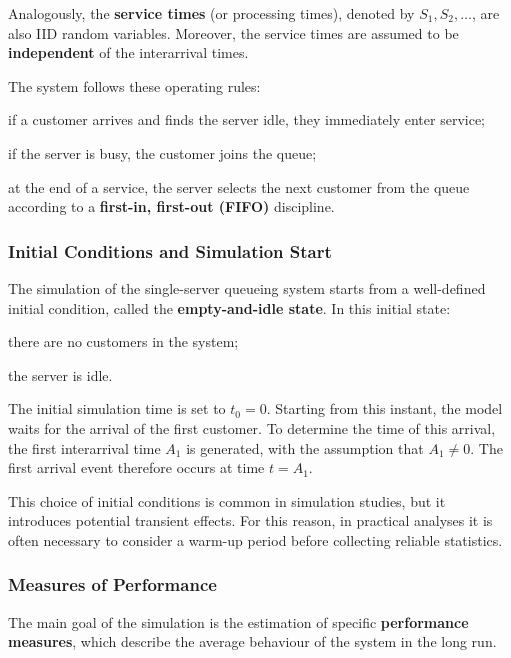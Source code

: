 Analogously, the \textbf{service times} (or processing times), denoted by $S_1, S_2, \dots$, are also IID random variables. Moreover, the service times are assumed to be \textbf{independent} of the interarrival times.

The system follows these operating rules:
\begin{compactitemize}
    \item if a customer arrives and finds the server idle, they immediately enter service;
    \item if the server is busy, the customer joins the queue;
    \item at the end of a service, the server selects the next customer from the queue according to a \textbf{first-in, first-out (FIFO)} discipline.
\end{compactitemize}

\subsubsection{Initial Conditions and Simulation Start}

The simulation of the single-server queueing system starts from a well-defined initial condition, called the \textbf{empty-and-idle state}.
In this initial state:
\begin{compactitemize}
    \item there are no customers in the system;
    \item the server is idle.
\end{compactitemize}

The initial simulation time is set to $t_0 = 0$. Starting from this instant, the model waits for the arrival of the first customer.
To determine the time of this arrival, the first interarrival time $A_1$ is generated, with the assumption that $A_1 \neq 0$. The first arrival event therefore occurs at time $t = A_1$.

This choice of initial conditions is common in simulation studies, but it introduces potential transient effects. For this reason, in practical analyses it is often necessary to consider a warm-up period before collecting reliable statistics.

\subsubsection{Measures of Performance}

The main goal of the simulation is the estimation of specific \textbf{performance measures}, which describe the average behaviour of the system in the long run.

